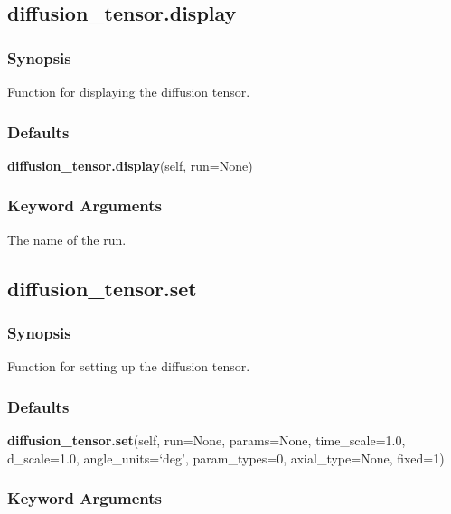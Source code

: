 \subsection{diffusion\_tensor.display}


\subsubsection{Synopsis}

Function for displaying the diffusion tensor.



\subsubsection{Defaults}

\textsf{\textbf{diffusion\_tensor.display}(self, run=None)}


\subsubsection{Keyword Arguments}

  The name of the run. 





\newpage

\subsection{diffusion\_tensor.set}


\subsubsection{Synopsis}

Function for setting up the diffusion tensor.



\subsubsection{Defaults}

\textsf{\textbf{diffusion\_tensor.set}(self, run=None, params=None, time\_scale=1.0, d\_scale=1.0, angle\_units=`deg', param\_types=0, axial\_type=None, fixed=1)}


\subsubsection{Keyword Arguments}

